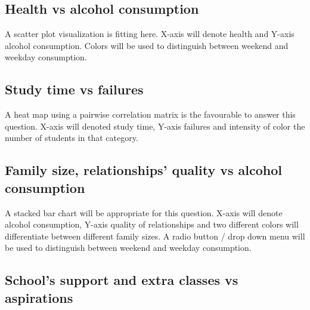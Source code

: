 \documentclass[titlepage, 12pt]{article}
\begin{document}
\subsection{Health vs alcohol consumption}
A scatter plot visualization is fitting here. X-axis will denote health and
Y-axis alcohol consumption. Colors will be used to distinguish between weekend
and weekday consumption.

\subsection{Study time vs failures}
A heat map using a pairwise correlation matrix is the favourable to answer this
question. X-axis will denoted study time, Y-axis failures and intensity of color
the number of students in that category.

\subsection{Family size, relationships' quality vs alcohol consumption}
A stacked bar chart will be appropriate for this question. X-axis will denote
alcohol consumption, Y-axis quality of relationships and two different colors
will differentiate between different family sizes. A radio button / drop down
menu will be used to distinguish between weekend and weekday consumption.

\subsection{School's support and extra classes vs aspirations}
\end{document}
